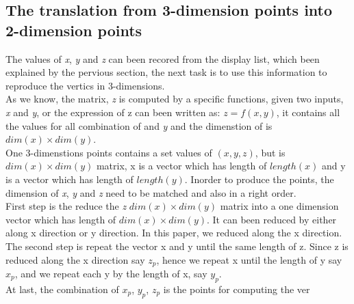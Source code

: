 \documentclass[a4paper,10pt]{article}
\begin{document}
\subsection{The translation from 3-dimension points into 2-dimension points}
The values of \emph{x}, \emph{y} and \emph{z} can been recored from the display list, which been explained by the pervious section, the next task is to use this information to reproduce the vertics in 3-dimensions.\\
As we know, the matrix, \emph{z} is computed by a specific functions, given two inputs, \emph{x} and \emph{y}, or the expression of z can been written as: $z = f(x,y)$, it contains all the values for all combination of  and \emph{y} and the dimenstion of  is $dim(x) \times dim(y)$.\\
One 3-dimenstions points contains a set values of $(x, y, z)$, but  is $dim(x) \times dim(y)$ matrix, x is a vector which has length of $length(x)$ and y is a vector which has length of $length(y)$. Inorder to produce the points, the dimension of \emph{x}, \emph{y} and \emph{z} need to be matched and also in a right order.\\
First step is the reduce the \emph{z} $dim(x) \times dim(y)$ matrix into a one dimension vector which has length of $dim(x) \times dim(y)$. It can been reduced by either along x direction or y direction. In this paper, we reduced along the x direction. The second step is repeat the vector x and y until the same length of z. Since z is reduced along the x direction say $z_p$, hence we repeat x until the length of y say $x_p$, and we repeat each y by the length of x, say $y_p$. \\
At last, the combination of $x_p$, $y_p$, $z_p$ is the points for computing the ver
 
\end{document}
